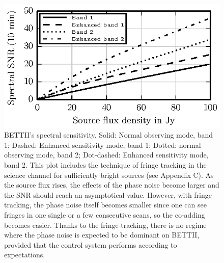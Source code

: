 \begin{figure}[ht!]
\begin{center}
\includegraphics[width=\textwidth]{Figures/f4.eps}
\caption[BETTII Spectral SNR]{%
BETTII's spectral sensitivity. Solid: Normal observing mode, band 1; Dashed: Enhanced sensitivity mode, band 1; Dotted: normal observing mode, band 2; Dot-dashed: Enhanced sensitivity mode, band 2. This plot includes the technique of fringe tracking in the science channel for sufficiently bright sources (see Appendix C). As the source flux rises, the effects of the phase noise become larger and the SNR should reach an asymptotical value. However, with fringe tracking, the phase noise itself becomes smaller since one can see fringes in one single or a few consecutive scans, so the co-adding becomes easier. Thanks to the fringe-tracking, there is no regime where the phase noise is expected to be dominant on BETTII, provided that the control system performs according to expectations.}
\label{fig:SpectralSNR}
\end{center}
\end{figure}
